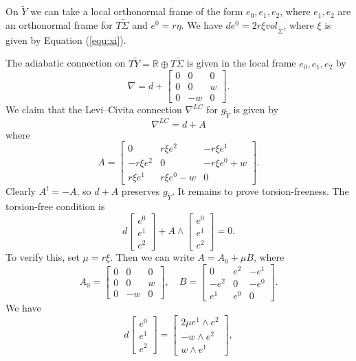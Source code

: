 \documentclass{amsart}
\theoremstyle{definition}
\theoremstyle{remark}
\numberwithin{equation}{section}
\begin{document}
On $\widetilde{Y}$ we can take a local orthonormal frame of the form $e_0 , e_1 , e_2$, where $e_1, e_2$ are an orthonormal frame for $T\widetilde{\Sigma}$ and $e^0 = r \eta$. We have $de^0 = 2r\xi vol_{\widetilde{\Sigma}}$, where $\xi$ is given by Equation (\ref{equ:xi}).

The adiabatic connection on $T\widetilde{Y} = \mathbb{R} \oplus T\widetilde{\Sigma}$ is given in the local frame $e_0,e_1,e_2$ by
\[
\nabla = d + \left[ \begin{matrix} 0 & 0 & 0 \\ 0 & 0 & w \\ 0 & -w & 0 \end{matrix} \right].
\]
We claim that the Levi--Civita connection $\nabla^{LC}$ for $g_{\widetilde{Y}}$ is given by
\[
\nabla^{LC} = d + A
\]
where
\[
A = \left[ \begin{matrix} 0 & r\xi e^2 & -r\xi e^1 \\ -r\xi e^2 & 0 & -r\xi e^0 + w \\ r\xi e^1 & r\xi e^0 - w & 0 \end{matrix} \right].
\]
Clearly $A^t = -A$, so $d+A$ preserves $g_{\widetilde{Y}}$. It remains to prove torsion-freeness. The torsion-free condition is
\[
d \left[ \begin{matrix} e^0 \\ e^1 \\ e^2 \end{matrix} \right] + A \wedge \left[ \begin{matrix} e^0 \\ e^1 \\ e^2 \end{matrix} \right] = 0.
\]
To verify this, set $\mu = r \xi$. Then we can write $A = A_0 + \mu B$, where
\[
A_0 = \left[ \begin{matrix} 0 & 0 & 0 \\ 0 & 0 & w \\ 0 & -w & 0 \end{matrix} \right], \quad B = \left[ \begin{matrix} 0 & e^2 & -e^1 \\ -e^2 & 0 & -e^0 \\ e^1 & e^0 & 0 \end{matrix} \right].
\]
We have
\[
d \left[ \begin{matrix} e^0 \\ e^1 \\ e^2 \end{matrix} \right] = \left[ \begin{matrix} 2 \mu e^1 \wedge e^2 \\ -w \wedge e^2 \\ w \wedge e^1 \end{matrix} \right],
\]
\end{document}
